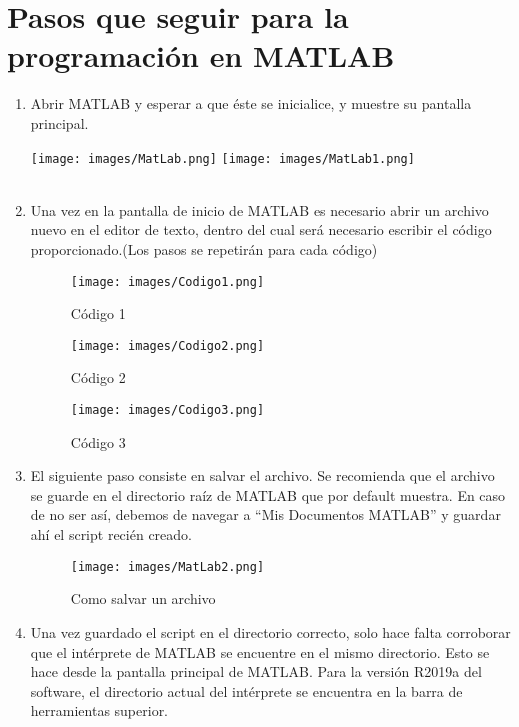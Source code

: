 \documentclass{article}
\begin{document}
\section{Pasos que seguir para la programación en MATLAB}
\begin{enumerate}
\item   Abrir MATLAB y esperar a que éste se inicialice, y muestre su pantalla principal. 

\texttt{[image: images/MatLab.png]} %
\texttt{[image: images/MatLab1.png]} %
\\
\\
\newpage
\item   Una vez en la pantalla de inicio de MATLAB es necesario abrir un archivo nuevo en el editor de texto, dentro del cual será necesario escribir el código proporcionado.(Los pasos se repetirán para cada código)

\begin{figure}[h] %
    \centering
    \texttt{[image: images/Codigo1.png]} %
    \caption{C\'{o}digo 1}
\end{figure}

\begin{figure}[h] %
    \centering
    \texttt{[image: images/Codigo2.png]} %
    \caption{C\'{o}digo 2}
\end{figure}

\newpage

\begin{figure}[h] %
    \centering
    \texttt{[image: images/Codigo3.png]} %
    \caption{C\'{o}digo 3}
\end{figure}

\newpage

\item   El siguiente paso consiste en salvar el archivo. Se recomienda que el archivo se guarde en el directorio raíz de MATLAB que por default muestra. En caso de no ser así, debemos de navegar a “Mis Documentos  MATLAB” y guardar ahí el script recién creado. 

\begin{figure}[h] %
    \centering
    \texttt{[image: images/MatLab2.png]} %
    \caption{Como salvar un archivo}
\end{figure}


\item   Una vez guardado el script en el directorio correcto, solo hace falta corroborar que el intérprete de MATLAB se encuentre en el mismo directorio. Esto se hace desde la pantalla principal de MATLAB. Para la versión R2019a del software, el directorio actual del intérprete se encuentra en la barra de herramientas superior.




\end{enumerate}
\end{document}
